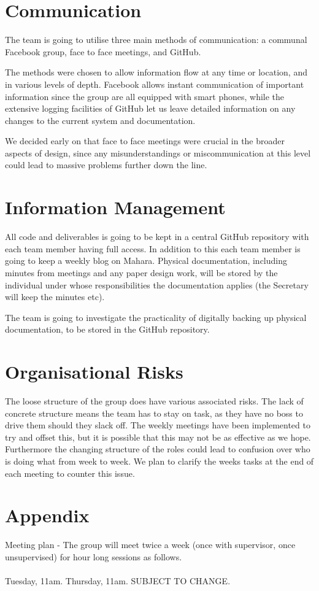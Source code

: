 \documentclass{l3deliverable}
\begin{document}
\section{Communication}
\label{sec:com}

The team is going to utilise three main methods of communication: a
communal Facebook group, face to face meetings, and GitHub.

The methods were chosen to allow information flow at any time or location,
and in various levels of depth. Facebook allows instant communication
of important information since the group are all equipped with
smart phones, while the extensive logging facilities of GitHub let us
leave detailed information on any changes to the current system and
documentation.

We decided early on that face to face meetings were
crucial in the broader aspects of design, since any misunderstandings
or miscommunication at this level could lead to massive problems
further down the line.

\section{Information Management}

All code and deliverables is going to be kept in a central GitHub repository 
with each team member having full access. In addition to this each team member
is going to keep a weekly blog on Mahara. Physical documentation,
including minutes from meetings and any paper design work, will be
stored by the individual under whose responsibilities the
documentation applies (the Secretary will keep the minutes etc).

The team is going to investigate the practicality of digitally backing up
physical documentation, to be stored in the GitHub repository.

\section{Organisational Risks}

The loose structure of the group does have various associated
risks. The lack of concrete structure means the team has to stay on
task, as they have no boss to drive them should they slack off. The
weekly meetings have been implemented to try and offset this, but it
is possible that this may not be as effective as we hope. Furthermore
the changing structure of the roles could lead to confusion over who
is doing what from week to week. We plan to clarify the weeks tasks at
the end of each meeting to counter this issue.

\pagebreak

\appendix

\section{Appendix}

Meeting plan - The group will meet twice a week (once with supervisor, once 
unsupervised) for hour long sessions as follows.\\
\\
Tuesday, 11am. Thursday, 11am. SUBJECT TO CHANGE.
\end{document}

